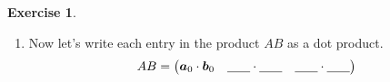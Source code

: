 \documentclass[
]{book}
\providecommand{\tightlist}{%
  \setlength{\itemsep}{0pt}\setlength{\parskip}{0pt}}
\theoremstyle{definition}
\theoremstyle{definition}
\theoremstyle{definition}
\newtheorem{exercise}{Exercise}[chapter]
\theoremstyle{remark}
\begin{document}
\begin{exercise}
\begin{enumerate}
  \begin{enumerate}
  \def\labelenumii{\roman{enumii}.}
  \tightlist
  \item
    The rows of \(A\) can be written as the vectors
    \[ \boldsymbol{a}_0 = \begin{pmatrix} 1 & 2 \end{pmatrix} \]
    \[ \boldsymbol{a}_1 = \begin{pmatrix} \underline{\hspace{0.5in}} & \underline{\hspace{0.5in}} \end{pmatrix} \]
    \[ \boldsymbol{a}_2 = \begin{pmatrix} \underline{\hspace{0.5in}} & \underline{\hspace{0.5in}} \end{pmatrix} \]
  \item
    The columns of \(B\) can be written as the vectors
    \[ \boldsymbol{b}_0 = \begin{pmatrix} 7 \\ 10 \end{pmatrix} \]
    \[ \boldsymbol{b}_1 = \begin{pmatrix} \underline{\hspace{0.5in}} \\ \underline{\hspace{0.5in}} \end{pmatrix} \]
    \[ \boldsymbol{b}_2 = \begin{pmatrix} \underline{\hspace{0.5in}} \\ \underline{\hspace{0.5in}} \end{pmatrix} \]
  \end{enumerate}
\item
  Now let's write each entry in the product \(AB\) as a dot product.
  \[ AB = \begin{pmatrix} \boldsymbol{a}_0 \cdot \boldsymbol{b}_0 & \underline{\hspace{0.25in}} \cdot \underline{\hspace{0.25in}} & \underline{\hspace{0.25in}} \cdot \underline{\hspace{0.25in}} \\

\end{pmatrix}\]
\end{enumerate}
\end{exercise}
\end{document}
